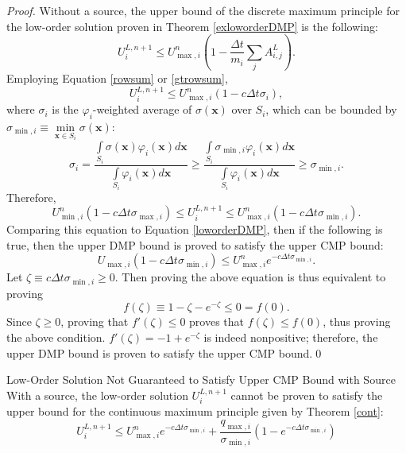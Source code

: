 \begin{proof}
Without a source, the upper bound of the discrete maximum principle for the low-order solution
proven in Theorem \ref{exloworderDMP} is the following:
\[
   U_i^{L,n+1}\leq
   U_{\max,i}^n\left(1-\frac{\Delta t}{m_i}\sum\limits_j A^L_{i,j}\right).
\]
Employing Equation \eqref{rowsum} or \eqref{gtrowsum},
\[
   U_i^{L,n+1} \le
   U_{\max,i}^n(1-c\Delta t\sigma_i),
\]
where $\sigma_i$ is the $\varphi_i$-weighted average of $\sigma(\mathbf{x})$ over
$S_i$, which can be bounded by
$\sigma_{\min,i}\equiv\min\limits_{\mathbf{x}\in S_i}\sigma(\mathbf{x})$:
\[
   \sigma_i = \frac{\int\limits_{S_i}\sigma(\mathbf{x})\varphi_i(\mathbf{x})d\mathbf{x}}{\int\limits_{S_i}\varphi_i(\mathbf{x})d\mathbf{x}}
   \ge \frac{\int\limits_{S_i}\sigma_{\min,i}\varphi_i(\mathbf{x})d\mathbf{x}}{\int\limits_{S_i}\varphi_i(\mathbf{x})d\mathbf{x}}
   \ge \sigma_{\min,i}.
\]
Therefore,
\[
   U_{\min,i}^n(1-c\Delta t\sigma_{\max,i}) \le
   U_i^{L,n+1} \le
   U_{\max,i}^n(1-c\Delta t\sigma_{\min,i}).
\]
Comparing this equation to Equation \eqref{loworderDMP}, then if the following is true,
then the upper DMP bound is proved to satisfy the upper CMP bound:
\[
   U_{\max,i}(1-c\Delta t\sigma_{\min,i}) \le U_{\max,i}^n e^{-c\Delta t\sigma_{\min,i}}.
\]
Let $\zeta\equiv c\Delta t\sigma_{\min,i}\ge 0$. Then proving the above equation is
thus equivalent to proving
\[
   f(\zeta)\equiv 1-\zeta-e^{-\zeta} \le 0 = f(0).
\]
Since $\zeta\ge 0$, proving that $f'(\zeta)\le 0$ proves that $f(\zeta)\le f(0)$, thus
proving the above condition. $f'(\zeta)=-1+e^{-\zeta}$ is indeed nonpositive; therefore,
the upper DMP bound is proven to satisfy the upper CMP bound.\qed
\end{proof}
\begin{corollary}{Low-Order Solution Not Guaranteed to Satisfy Upper CMP Bound with Source}
   With a source, the low-order solution $U_i^{L,n+1}$ cannot be proven to satisfy the upper bound
   for the continuous maximum principle given by Theorem \ref{cont}:
   \[
      U_i^{L,n+1} \le
      U_{\max,i}^n e^{-c\Delta t\sigma_{\min,i}} + \frac{q_{\max,i}}{\sigma_{\min,i}}(1-e^{-c\Delta t\sigma_{\min,i}})
   \]
\end{corollary}

